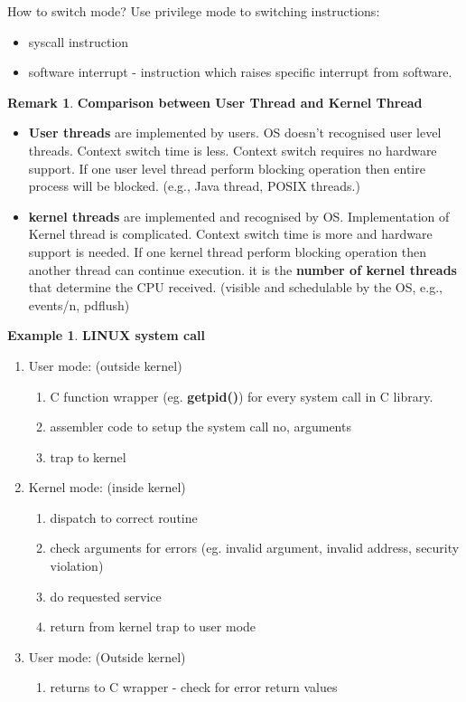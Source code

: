 \documentclass[11pt,a4paper]{article}
\theoremstyle{definition}
\newtheorem*{remark}{Remark}
\newtheorem{example}{Example}[section]
\newenvironment{myitemize}
{ \begin{itemize}
    \setlength{\itemsep}{5pt}
    \setlength{\parskip}{0pt}
    \setlength{\parsep}{0pt}     }
{ \end{itemize}                  }
\newenvironment{myenumerate}
{ \begin{enumerate}
    \setlength{\itemsep}{5pt}
    \setlength{\parskip}{0pt}
    \setlength{\parsep}{0pt}     }
{ \end{enumerate}                }
\begin{document}
\begin{tcolorbox}
	\textsf{How to switch mode?} Use privilege mode to switching instructions:
	\begin{myitemize}
		\item syscall instruction
		\item software interrupt - instruction which raises specific interrupt from software.
	\end{myitemize}
\end{tcolorbox}

\begin{remark}{\textbf{Comparison between User Thread and Kernel Thread}}
	\begin{myitemize}
		\item \textbf{User threads} are implemented by users. OS doesn’t recognised user level threads. Context switch time is less. Context switch requires no hardware support. If one user level thread perform blocking operation then entire process will be blocked. (e.g., Java thread, POSIX threads.)
		\item \textbf{kernel threads} are implemented and recognised by OS. Implementation of Kernel thread is complicated. Context switch time is more and hardware support is needed. If one kernel thread perform blocking operation then another thread can continue execution. it is the \textbf{number of kernel threads} that determine the CPU received. (visible and schedulable by the OS, e.g., events/n, pdflush)
	\end{myitemize}
\end{remark}

\begin{example}{\textbf{LINUX system call}}
	\begin{myenumerate}
		\item User mode: (outside kernel)
		\begin{myenumerate}
			\item C function wrapper (eg. \textbf{getpid()}) for every system call in C library.
			\item assembler code to setup the system call no, arguments
			\item trap to kernel	
		\end{myenumerate}
		\item Kernel mode: (inside kernel)
		\begin{myenumerate}
			\item dispatch to correct routine
			\item check arguments for errors (eg. invalid argument, invalid address, security violation)
			\item do requested service
			\item return from kernel trap to user mode
		\end{myenumerate}
		\item User mode: (Outside kernel)
		\begin{myenumerate}
			\item returns to C wrapper - check for error return values
		\end{myenumerate}
	\end{myenumerate}
\end{example}
\end{document}
